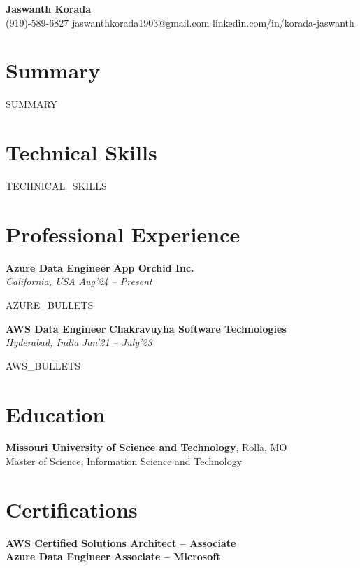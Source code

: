 \documentclass[10pt,letterpaper]{article}
\begin{document}
\begin{center}
{\LARGE \textbf{Jaswanth Korada}}\\
(919)-589-6827 \textbar{} jaswanthkorada1903@gmail.com \textbar{} linkedin.com/in/korada-jaswanth
\end{center}

\section*{Summary}
{{SUMMARY}}

\section*{Technical Skills}
{{TECHNICAL_SKILLS}}

\section*{Professional Experience}
\textbf{Azure Data Engineer} \hfill \textbf{App Orchid Inc.}\\
\textit{California, USA} \hfill \textit{Aug'24 -- Present}
\begin{itemize}
{{AZURE_BULLETS}}
\end{itemize}

\textbf{AWS Data Engineer} \hfill \textbf{Chakravuyha Software Technologies}\\
\textit{Hyderabad, India} \hfill \textit{Jan'21 -- July'23}
\begin{itemize}
{{AWS_BULLETS}}
\end{itemize}

\section*{Education}
\textbf{Missouri University of Science and Technology}, Rolla, MO\\
Master of Science, Information Science and Technology

\section*{Certifications}
\textbf{AWS Certified Solutions Architect -- Associate}\\
\textbf{Azure Data Engineer Associate -- Microsoft}
\end{document}
